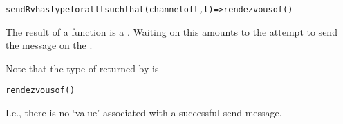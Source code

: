 \begin{alltt}
sendRv has type for all t such that (channel of t,t)=>rendezvous of ()
\end{alltt}

The result of a  function is a . Waiting on this  amounts to the attempt to send the message on the .

\begin{aside}
Note that the type of  returned by  is 
\begin{alltt}
rendezvous of ()
\end{alltt}
I.e., there is no `value' associated with a successful send message.
\end{aside}


